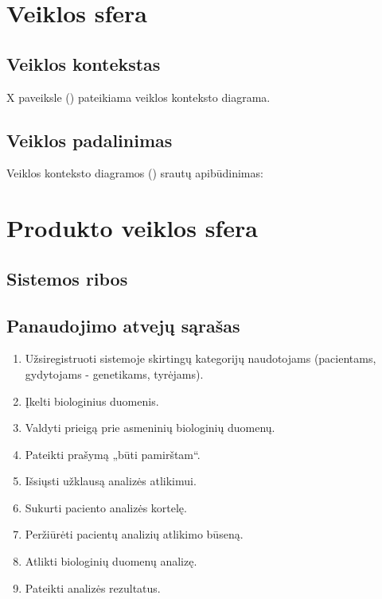 \documentclass[12pt]{article}
\begin{document}
\section{Veiklos sfera} %
\subsection{Veiklos kontekstas} %
X paveiksle () pateikiama veiklos konteksto diagrama.

\subsection{Veiklos padalinimas}
Veiklos konteksto diagramos () srautų apibūdinimas:


\newpage

\section{Produkto veiklos sfera} %
\subsection{Sistemos ribos} %

\subsection{Panaudojimo atvejų sąrašas}
\begin{enumerate}
    \item Užsiregistruoti sistemoje skirtingų kategorijų naudotojams
    (pacientams, gydytojams - genetikams, tyrėjams).
    \item Įkelti biologinius duomenis.
    \item Valdyti prieigą prie asmeninių biologinių duomenų.
    \item Pateikti prašymą „būti pamirštam“.
    \item Išsiųsti užklausą analizės atlikimui.
    \item Sukurti paciento analizės kortelę.
    \item Peržiūrėti pacientų analizių atlikimo būseną.
    \item Atlikti biologinių duomenų analizę. %
    \item Pateikti analizės rezultatus.
\end{enumerate}

\newpage
\end{document}
